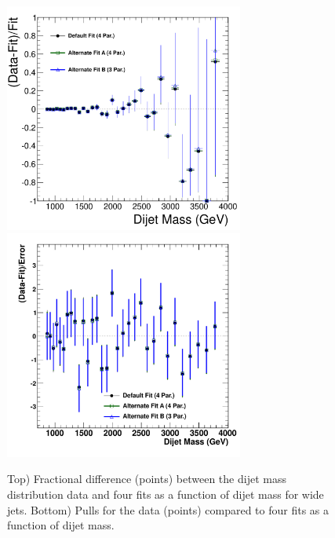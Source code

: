 \begin{figure}[!ht]
  \begin{center}
        \includegraphics[width=0.7\textwidth]{Figures/Fractional_Diff_All_fat.pdf}
        \includegraphics[width=0.7\textwidth]{Figures/Pulls_All_fat.pdf}
    \caption{ Top) Fractional difference (points) between the dijet mass distribution 
data and four fits as a function of dijet mass for wide jets.
Bottom) Pulls for the data (points) compared to four fits as a function of dijet mass.}
    \label{dijetmassFits_wide}
  \end{center}
\end{figure}

